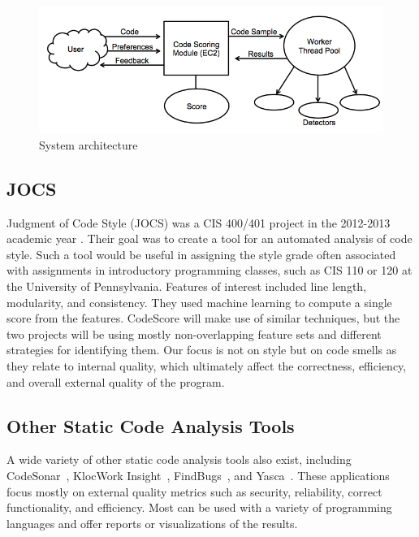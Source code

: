 \documentclass{sig-alternate}
\begin{document}
\begin{figure}[ht]
	\begin{center}
		\includegraphics[width=0.9\linewidth]{block_diagram}
	\end{center}
	\vspace{-12pt}
	\caption{System architecture}
	\label{fig:some_graph}
\end{figure}

\subsection{JOCS}
Judgment of Code Style (JOCS) was a CIS 400/401 project in the 2012-2013
academic year \cite{close2013jocs}. Their goal was to create a tool for an automated
analysis of code style. Such a tool would be useful in assigning the style grade
often associated with assignments in introductory programming classes, such as
CIS 110 or 120 at the University of Pennsylvania. Features of interest included
line length, modularity, and consistency. They used machine learning to compute
a single score from the features. CodeScore will make use of similar techniques,
but the two projects will be using mostly non-overlapping feature sets and
different strategies for identifying them. Our focus is not on style but on code
smells as they relate to internal quality, which ultimately affect the
correctness, efficiency, and overall external quality of the program. 

\subsection{Other Static Code Analysis Tools}
A wide variety of other static code analysis tools also exist, including
CodeSonar~\cite{grammatech2013codesonar}, KlocWork Insight~\cite{klocwork2013insight},
FindBugs~\cite{pugh2013findbugs}, and Yasca~\cite{scovetta2007yasca}. These
applications focus mostly on external quality metrics such as security,
reliability, correct functionality, and efficiency. Most can be used with a variety of
programming languages and offer reports or visualizations of the results.
\end{document}
